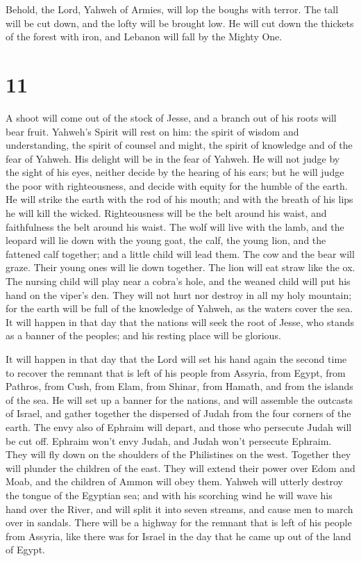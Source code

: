  Behold, the Lord, Yahweh of Armies, will lop the boughs
with terror. The tall will be cut down, and the lofty will be brought
low.  He will cut down the thickets of the forest with
iron, and Lebanon will fall by the Mighty One.

\hypertarget{section-10}{%
\section{11}\label{section-10}}

 A shoot will come out of the stock of Jesse, and a branch
out of his roots will bear fruit.  Yahweh's Spirit will
rest on him: the spirit of wisdom and understanding, the spirit of
counsel and might, the spirit of knowledge and of the fear of Yahweh.
 His delight will be in the fear of Yahweh. He will not
judge by the sight of his eyes, neither decide by the hearing of his
ears;  but he will judge the poor with righteousness, and
decide with equity for the humble of the earth. He will strike the earth
with the rod of his mouth; and with the breath of his lips he will kill
the wicked.  Righteousness will be the belt around his
waist, and faithfulness the belt around his waist.  The
wolf will live with the lamb, and the leopard will lie down with the
young goat, the calf, the young lion, and the fattened calf together;
and a little child will lead them.  The cow and the bear
will graze. Their young ones will lie down together. The lion will eat
straw like the ox.  The nursing child will play near a
cobra's hole, and the weaned child will put his hand on the viper's den.
 They will not hurt nor destroy in all my holy mountain;
for the earth will be full of the knowledge of Yahweh, as the waters
cover the sea.  It will happen in that day that the
nations will seek the root of Jesse, who stands as a banner of the
peoples; and his resting place will be glorious.

 It will happen in that day that the Lord will set his
hand again the second time to recover the remnant that is left of his
people from Assyria, from Egypt, from Pathros, from Cush, from Elam,
from Shinar, from Hamath, and from the islands of the sea.
 He will set up a banner for the nations, and will
assemble the outcasts of Israel, and gather together the dispersed of
Judah from the four corners of the earth.  The envy also
of Ephraim will depart, and those who persecute Judah will be cut off.
Ephraim won't envy Judah, and Judah won't persecute Ephraim.
 They will fly down on the shoulders of the Philistines
on the west. Together they will plunder the children of the east. They
will extend their power over Edom and Moab, and the children of Ammon
will obey them.  Yahweh will utterly destroy the tongue
of the Egyptian sea; and with his scorching wind he will wave his hand
over the River, and will split it into seven streams, and cause men to
march over in sandals.  There will be a highway for the
remnant that is left of his people from Assyria, like there was for
Israel in the day that he came up out of the land of Egypt.


